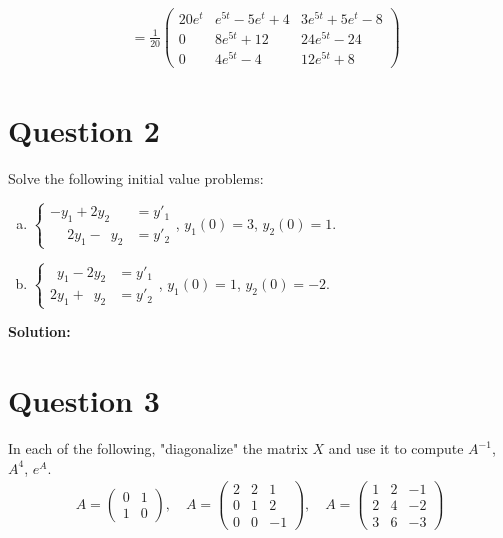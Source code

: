 \documentclass{article}
\begin{document}
\begin{align*}
    &= \frac{1}{20} \begin{pmatrix}20e^t & e^{5t} - 5e^t + 4 & 3e^{5t} + 5e^t - 8 \\ 0 & 8e^{5t} + 12 & 24e^{5t} - 24 \\ 0 & 4e^{5t} - 4 & 12e^{5t} + 8 \end{pmatrix}
\end{align*}

\section*{Question 2}
Solve the following initial value problems:
\begin{enumerate}[a.]
    \item $\left\{\begin{aligned}
        -y_1 + 2y_2 &= y'_1 \\
        \phantom{-}2y_1 - \phantom{2}y_2 &= y'_2
    \end{aligned}\right.$, \; $y_1(0) = 3$, \; $y_2(0) = 1$.
    \item $\left\{\begin{aligned}
        \phantom{2}y_1 - 2y_2 &= y'_1 \\
        2y_1 + \phantom{2}y_2 &= y'_2
    \end{aligned}\right.$, \; $y_1(0) = 1$, \; $y_2(0) = -2$.
\end{enumerate}

\vspace{0.25cm}\noindent\textbf{Solution:}

\section*{Question 3}
In each of the following, "diagonalize" the matrix $X$ and use it to compute $A^{-1}$, $A^4$, $e^A$.
\begin{align*}
    A = \begin{pmatrix} 0 & 1 \\ 1 & 0 \end{pmatrix}, \quad
    A = \begin{pmatrix} 2 & 2 & 1 \\ 0 & 1 & 2 \\ 0 & 0 & -1 \end{pmatrix}, \quad
    A = \begin{pmatrix} 1 & 2 & -1 \\ 2 & 4 & -2 \\ 3 & 6 & -3 \end{pmatrix}
\end{align*}
\end{document}
